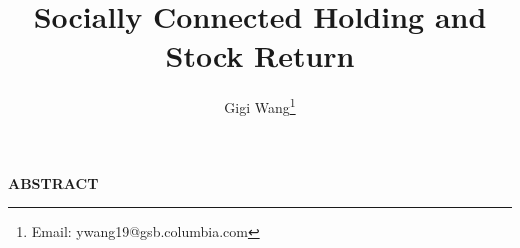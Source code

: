 \documentclass[11pt]{article}
\begin{document}
\onehalfspacing      %
\renewcommand{\footnote}{\endnote}  %

\author{Gigi Wang\thanks{Email: ywang19@gsb.columbia.com}}

\title{\huge \bf Socially Connected Holding and Stock Return}

\date{}              %


\maketitle
\thispagestyle{empty}

\bigskip

\centerline{\bf ABSTRACT}

\begin{doublespace}  %
  \noindent 
  \lipsum [1-1] 
\end{doublespace}

\medskip
\clearpage
\end{document}
